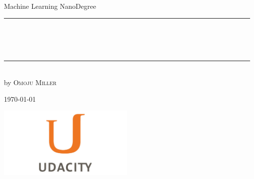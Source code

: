 
\begin{titlepage}
    \begin{addmargin}[-1cm]{-3cm}
    \begin{center}
        \large
       

        \vfill

        Machine Learning NanoDegree\\ \vskip1cm
        \rule{14cm}{0.4pt}\\ \bigskip
        \begingroup
            \Large
            \color{Maroon}\spacedallcaps{\myTitle} \\ \bigskip
        \endgroup
        \spacedlowsmallcaps{\mySubtitle} \\ \bigskip
        \rule{14cm}{0.4pt}\\ \vskip1cm
        by \textsc{Omoju Miller}

        \vfill
        \vfill
        \vfill

       
        \hfill \today
    \end{center}
    \vspace{-3.5cm}
    \includegraphics[width=0.50\textwidth]{figures/udacityLogo}
  \end{addmargin}
\end{titlepage}
